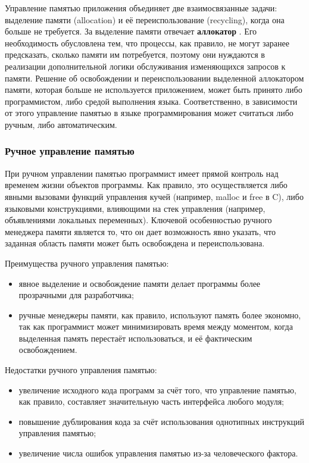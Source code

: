 Управление памятью приложения объединяет две взаимосвязанные задачи: выделение памяти (allocation) и её переиспользование (recycling), когда она больше не требуется. За выделение памяти отвечает \textbf{аллокатор} \cite{allocator}. Его необходимость обусловлена тем, что процессы, как правило, не могут заранее предсказать, сколько памяти им потребуется, поэтому они нуждаются в реализации дополнительной логики обслуживания изменяющихся запросов к памяти. Решение об освобождении и переиспользовании выделенной аллокатором памяти, которая больше не используется приложением, может быть принято либо программистом, либо средой выполнения языка. Соответственно, в зависимости от этого управление памятью в языке программирования может считаться либо ручным, либо автоматическим.

\subsubsection{Ручное управление памятью}

При ручном управлении памятью программист имеет прямой контроль над временем жизни объектов программы. Как правило, это осуществляется либо явными вызовами функций управления кучей (например, malloc и free в C), либо языковыми конструкциями, влияющими на стек управления (например, объявлениями локальных переменных). Ключевой особенностью ручного менеджера памяти является то, что он дает возможность явно указать, что заданная область памяти может быть освобождена и переиспользована. \cite{mm_overview}

Преимущества ручного управления памятью: 

\begin{itemize}[label*=---]
	\item явное выделение и освобождение памяти делает программы более прозрачными для разработчика;
	\item ручные менеджеры памяти, как правило, используют память более экономно, так как программист может минимизировать время между моментом, когда выделенная память перестаёт использоваться, и её фактическим освобождением.
\end{itemize}

Недостатки ручного управления памятью: 

\begin{itemize}[label*=---]
	\item увеличение исходного кода программ за счёт того, что управление памятью, как правило, составляет значительную часть интерфейса любого модуля;
	\item повышение дублирования кода за счёт использования однотипных инструкций управления памятью;
	\item увеличение числа ошибок управления памятью из-за человеческого фактора.
\end{itemize}

